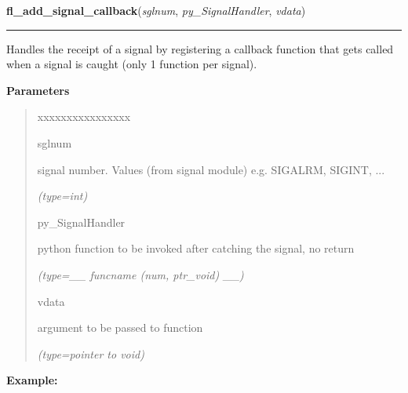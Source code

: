     \label{xformslib:flbasic:fl_add_signal_callback}

    \vspace{0.5ex}

\hspace{.8\funcindent}\begin{boxedminipage}{\funcwidth}

    \raggedright \textbf{fl\_add\_signal\_callback}(\textit{sglnum}, \textit{py\_SignalHandler}, \textit{vdata})

    \vspace{-1.5ex}

    \rule{\textwidth}{0.5\fboxrule}
\setlength{\parskip}{2ex}
    Handles the receipt of a signal by registering a callback function that
    gets called when a signal is caught (only 1 function per signal).

\setlength{\parskip}{1ex}
      \textbf{Parameters}
      \vspace{-1ex}

      \begin{quote}
        \begin{Ventry}{xxxxxxxxxxxxxxxx}

          \item[sglnum]

          signal number. Values (from signal module) e.g. SIGALRM, SIGINT, 
          ...

            {\it (type=int)}

          \item[py\_SignalHandler]

          python function to be invoked after catching the signal, no 
          return

            {\it (type=\_\_ funcname (num, ptr\_void) \_\_)}

          \item[vdata]

          argument to be passed to function

            {\it (type=pointer to void)}

        \end{Ventry}

      \end{quote}

\textbf{Example:}
\begin{quote}
  \begin{itemize}


\end{itemize}
\end{quote}
\end{boxedminipage}
